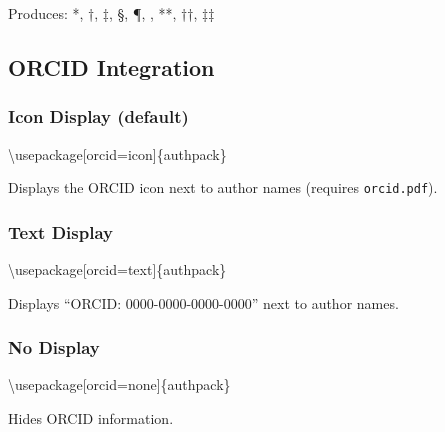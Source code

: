\documentclass[
]{article}
\newenvironment{Shaded}{}{}
\newcommand{\BuiltInTok}[1]{#1}
\newcommand{\ExtensionTok}[1]{#1}
\newcommand{\NormalTok}[1]{#1}
\begin{document}
Produces: *, †, ‡, §, ¶, \textbar\textbar, **, ††, ‡‡

\hypertarget{orcid-integration}{%
\subsection{ORCID Integration}\label{orcid-integration}}

\hypertarget{icon-display-default}{%
\subsubsection{Icon Display (default)}\label{icon-display-default}}

\begin{Shaded}
\begin{Highlighting}[]
\BuiltInTok{\textbackslash{}usepackage}\NormalTok{[orcid=icon]\{}\ExtensionTok{authpack}\NormalTok{\}}
\end{Highlighting}
\end{Shaded}

Displays the ORCID icon next to author names (requires
\texttt{orcid.pdf}).

\hypertarget{text-display}{%
\subsubsection{Text Display}\label{text-display}}

\begin{Shaded}
\begin{Highlighting}[]
\BuiltInTok{\textbackslash{}usepackage}\NormalTok{[orcid=text]\{}\ExtensionTok{authpack}\NormalTok{\}}
\end{Highlighting}
\end{Shaded}

Displays ``ORCID: 0000-0000-0000-0000'' next to author names.

\hypertarget{no-display}{%
\subsubsection{No Display}\label{no-display}}

\begin{Shaded}
\begin{Highlighting}[]
\BuiltInTok{\textbackslash{}usepackage}\NormalTok{[orcid=none]\{}\ExtensionTok{authpack}\NormalTok{\}}
\end{Highlighting}
\end{Shaded}

Hides ORCID information.
\end{document}
